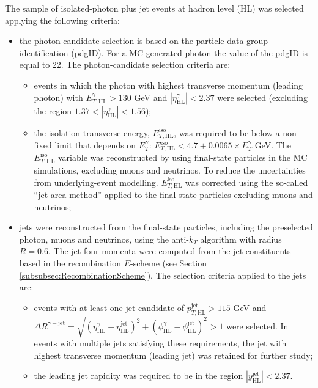 \documentclass[12pt, twoside]{article}
\numberwithin{equation}{section}
\numberwithin{figure}{section}
\begin{document}
The sample of isolated-photon plus jet events at hadron level (HL) was selected applying the following criteria:
\begin{itemize}
    \item the photon-candidate selection is based on the particle data group identification (pdgID). For a MC generated photon the value of the pdgID is equal to 22. The photon-candidate selection criteria are:
    \begin{itemize}
        \item events in which the photon with highest transverse momentum (leading photon) with $E^{\gamma}_{T, \text{HL}} > 130$ GeV and $\left| \eta^{\gamma}_{\text{HL}} \right| < 2.37$ were selected (excluding the region $1.37 < \left| \eta^{\gamma}_{\text{HL}} \right| < 1.56$);
        \item the isolation transverse energy, $E^{\text{iso}}_{T, \text{HL}}$, was required to be below a non-fixed limit that depends on $E^{\gamma}_{T}$: $E^{\text{iso}}_{T, \text{HL}} < 4.7 + 0.0065 \times E^{\gamma}_{T}$ GeV. The $E^{\text{iso}}_{T, \text{HL}}$ variable was reconstructed by using final-state particles in the MC simulations, excluding muons and neutrinos. To reduce the uncertainties from underlying-event modelling. $E^{\text{iso}}_{T, \text{HL}}$ was corrected using the so-called ``jet-area method'' applied to the final-state particles excluding muons and neutrinos;
    \end{itemize}
    \item jets were reconstructed from the final-state particles, including the preselected photon, muons and neutrinos, using the anti-$k_{T}$ algorithm with radius $R = 0.6$. The jet four-momenta were computed from the jet constituents based in the recombination $E$-scheme (see Section \ref{subsubsec:RecombinationScheme}). The selection criteria applied to the jets are:
    \begin{itemize}
        \item events with at least one jet candidate of $p^{\text{jet}}_{T, \text{HL}} > 115$ GeV and $\Delta R^{\gamma - \text{jet}} = \sqrt{\left(\eta^{\gamma}_{\text{HL}} - \eta^{\text{jet}}_{\text{HL}} \right)^{2} + \left(\phi^{\gamma}_{\text{HL}} - \phi^{\text{jet}}_{\text{HL}} \right)^{2}} > 1$ were selected. In events with multiple jets satisfying these requirements, the jet with highest transverse momentum (leading jet) was retained for further study;
        \item the leading jet rapidity was required to be in the region $\left| y^{\text{jet}}_{\text{HL}} \right| < 2.37$.
    \end{itemize}
\end{itemize}
\end{document}
